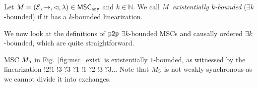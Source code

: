 \begin{definition}\label{def:ek_bounded_msc}
	Let $M = (\mathcal{E}, \rightarrow, \lhd, \lambda) \in \mathsf{MSC}_{\mathtt{asy}}$ and $k \in \mathbb{N}$. We call $M$ \emph{existentially $k$-bounded} ($\exists k$-bounded) if it has a $k$-bounded linearization.
\end{definition}
We now look at the definitions of $\mathtt{p2p}$ $\exists k$-bounded MSCs and causally ordered $\exists k$-bounded, which are quite straightforward.

\noindent
\begin{minipage}[c]{10.5cm}
\begin{example}
  MSC $M_{5}$ in Fig.~\ref{fig:msc_exist}
  is existentially $1$-bounded, as witnessed by the linearization $!2 !1\;!3\;?3\;?1\;!1\;?2\;!3\;?3 \ldots$
  Note that $M_{5}$ is not weakly synchronous as we cannot divide it into exchanges.
\end{example}
\end{minipage}
